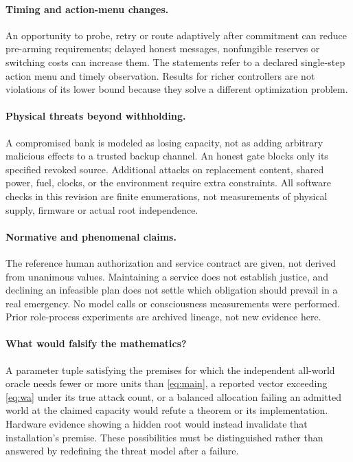 \documentclass[11pt,a4paper]{article}
\theoremstyle{definition}\newtheorem{definition}{Definition}
\begin{document}
\paragraph{Timing and action-menu changes.}
An opportunity to probe, retry or route adaptively after commitment can reduce pre-arming requirements; delayed honest messages, nonfungible reserves or switching costs can increase them. The statements refer to a declared single-step action menu and timely observation. Results for richer controllers are not violations of its lower bound because they solve a different optimization problem.

\paragraph{Physical threats beyond withholding.}
A compromised bank is modeled as losing capacity, not as adding arbitrary malicious effects to a trusted backup channel. An honest gate blocks only its specified revoked source. Additional attacks on replacement content, shared power, fuel, clocks, or the environment require extra constraints. All software checks in this revision are finite enumerations, not measurements of physical supply, firmware or actual root independence.

\paragraph{Normative and phenomenal claims.}
The reference human authorization and service contract are given, not derived from unanimous values. Maintaining a service does not establish justice, and declining an infeasible plan does not settle which obligation should prevail in a real emergency. No model calls or consciousness measurements were performed. Prior role-process experiments are archived lineage, not new evidence here.

\paragraph{What would falsify the mathematics?}
A parameter tuple satisfying the premises for which the independent all-world oracle needs fewer or more units than \cref{eq:main}, a reported vector exceeding \cref{eq:wa} under its true attack count, or a balanced allocation failing an admitted world at the claimed capacity would refute a theorem or its implementation. Hardware evidence showing a hidden root would instead invalidate that installation's premise. These possibilities must be distinguished rather than answered by redefining the threat model after a failure.
\end{document}
